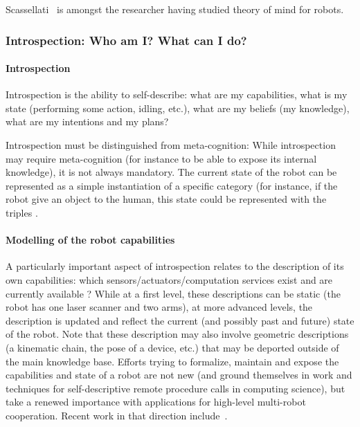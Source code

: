 Scassellati~\cite{Scassellati2002} is amongst the researcher having studied
theory of mind for robots.



\subsubsection{Introspection: Who am I? What can I do?}
\label{sect|introspection}

\paragraph{Introspection}

Introspection is the ability to self-describe: what are my capabilities, what
is my state (performing some action, idling, etc.), what are my beliefs (\ie my
knowledge), what are my intentions and my plans?

Introspection must be distinguished from meta-cognition: While introspection
may require meta-cognition (for instance to be able to expose its internal
knowledge), it is not always mandatory. The current state of the robot can be
represented as a simple instantiation of a specific category (for instance, if
the robot give an object to the human, this state could be represented with the
triples .

\paragraph{Modelling of the robot capabilities}

A particularly important aspect of introspection relates to the description of
its own capabilities: which sensors/actuators/computation services exist and
are currently available ?  While at a first level, these descriptions can be
static (\eg the robot has one laser scanner and two arms), at more advanced
levels, the description is updated and reflect the current (and possibly past
and future) state of the robot. Note that these description may also involve
geometric descriptions (a kinematic chain, the pose of a device, etc.) that may
be deported outside of the main knowledge base. Efforts trying to formalize,
maintain and expose the capabilities and state of a robot are not new (and
ground themselves in work and techniques for self-descriptive remote procedure
calls in computing science), but take a renewed importance with applications
for high-level multi-robot cooperation. Recent work in that direction
include~\cite{Kunze2011}.

